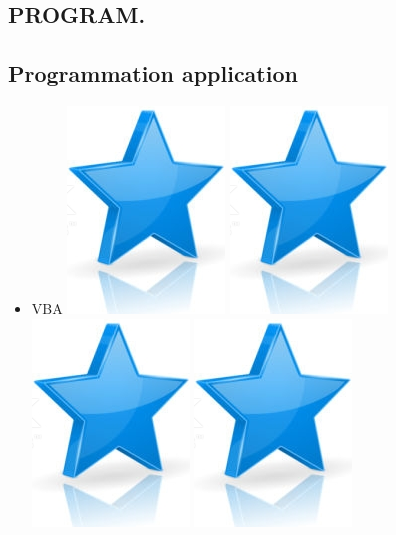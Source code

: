 \documentclass[10pt,a4paper,sans]{article}
\begin{document}
\begin{minipage}[t]{0.26\textwidth}
\begin{mdframed}[style=cadreCompetences]
        \section{PROGRAM.}
        \subsection{Programmation application}
            \begin{itemize}
                \item{VBA
                    \hfill
                    \includegraphics[scale=0.20]{img/star.png} \hspace{-0.2cm}
                    \includegraphics[scale=0.20]{img/star.png} \hspace{-0.2cm}
                    \includegraphics[scale=0.20]{img/star.png} \hspace{-0.2cm}
                    \includegraphics[scale=0.20]{img/star.png} \hspace{-0.2cm}
}
\end{itemize}
\end{mdframed}
\end{minipage}
\end{document}
